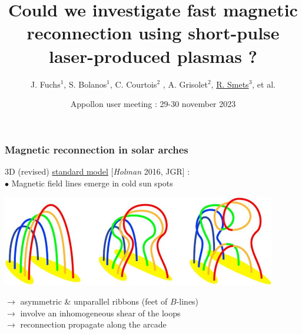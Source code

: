 \documentclass{beamer}
\title{Could we investigate fast magnetic reconnection using short-pulse laser-produced plasmas ?}
\author{J. Fuchs$^1$, S. Bolanos$^1$, C. Courtois$^2$ , A. Grisolet$^2$, \underline{R. Smets}$^3$, et al.}
\institute{$^1$LULI, $^2$CEA, $^3$LPP...}
\date{Appollon user meeting : 29-30 november 2023}
\begin{document}
\frame{\titlepage}



\begin{frame}
\frametitle{Magnetic reconnection in solar arches}

3D (revised) \underline{standard model} [\textit{Holman} 2016, JGR] : \\[0.4cm]
$\bullet$ Magnetic field lines emerge in cold sun spots

\begin{center}
\includegraphics[width=0.9\textwidth]{standard_model.jpg}
\end{center}

$\to$ asymmetric \& unparallel ribbons (feet of $B$-lines) \\
$\to$ involve an inhomogeneous shear of the loops \\
$\to$ reconnection propagate along the arcade \\

\end{frame}
\end{document}
